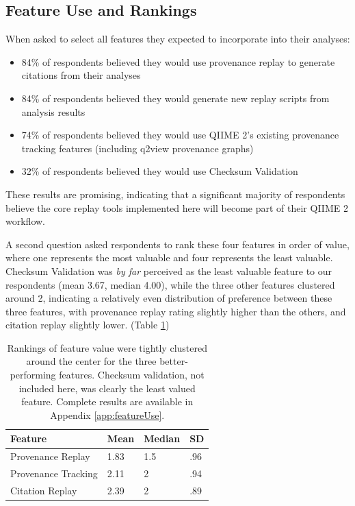 \subsection{Feature Use and Rankings}

When asked to select all features they expected to incorporate into their
analyses:

\begin{itemize}
    \item 84\% of respondents believed they would use provenance replay to
        generate citations from their analyses
    \item 84\% of respondents believed they would generate new replay scripts from analysis results
    \item 74\% of respondents believed they would use QIIME 2’s existing
        provenance tracking features (including q2view provenance graphs)
    \item 32\% of respondents believed they would use Checksum Validation
\end{itemize}

These results are promising, indicating that a significant majority of
respondents believe the core replay tools implemented here will become part of
their QIIME 2 workflow.

A second question asked respondents to rank these four features in order of
value, where one represents the most valuable and four represents the least
valuable. Checksum Validation was \textit{by far} perceived as the least valuable feature
to our respondents (mean 3.67, median 4.00), while the three other features
clustered around 2, indicating a relatively even distribution of preference
between these three features, with provenance replay rating slightly higher than
the others, and citation replay slightly lower. (Table \ref{tab:feature_rankings})


\begin{table}[htp]
    \centering
    \begin{tabular}{|p{}|p{}|p{}|p{}|}
    \hline
    Feature             & Mean & Median & SD  \\ \hline
    Provenance Replay   & 1.83 & 1.5    & .96 \\
    Provenance Tracking & 2.11 & 2      & .94 \\
    Citation Replay     & 2.39 & 2      & .89 \\ \hline
    \end{tabular}
    \caption[Respondent rankings of feature value]%
    {Rankings of feature value were tightly clustered around the center for the
    three better-performing features. Checksum validation, not included here,
    was clearly the least valued feature. Complete results are available in
    Appendix \ref{app:featureUse}.}
    \label{tab:feature_rankings}
\end{table}

